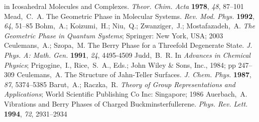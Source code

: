 \documentclass[superscriptaddress,showpacs,amsmath,amssymb,pra,twocolumn]{revtex4-1}
\begin{document}
\begin{thebibliography}{61}
  in Icosahedral Molecules and Complexes. \emph{Theor. Chim. Acta}
  \textbf{1978}, \emph{48}, 87--101\relax
\mciteBstWouldAddEndPuncttrue
\mciteSetBstMidEndSepPunct{\mcitedefaultmidpunct}
{\mcitedefaultendpunct}{\mcitedefaultseppunct}\relax
\EndOfBibitem
{}
Mead,~C.~A. The Geometric Phase in Molecular Systems. \emph{Rev. Mod.  Phys.} \textbf{1992}, \emph{64}, 51--85\relax
\mciteBstWouldAddEndPuncttrue
\mciteSetBstMidEndSepPunct{\mcitedefaultmidpunct}
{\mcitedefaultendpunct}{\mcitedefaultseppunct}\relax
\EndOfBibitem
{}
Bohm,~A.; Koizumi,~H.; Niu,~Q.; Zwanziger,~J.; Mostafazadeh,~A. \emph{The
  Geometric Phase in Quantum Systems}; {Springer: New York, USA}; 2003\relax
\mciteBstWouldAddEndPuncttrue
\mciteSetBstMidEndSepPunct{\mcitedefaultmidpunct}
{\mcitedefaultendpunct}{\mcitedefaultseppunct}\relax
\EndOfBibitem
{}
Ceulemans,~A.; Szopa,~M. The {{Berry}} Phase for a Threefold Degenerate State.
  \emph{J. Phys. A: Math. Gen.} \textbf{1991},
  \emph{24}, 4495-4509\relax
\mciteBstWouldAddEndPuncttrue
\mciteSetBstMidEndSepPunct{\mcitedefaultmidpunct}
{\mcitedefaultendpunct}{\mcitedefaultseppunct}\relax
\EndOfBibitem
{}
Judd,~B.~R. In \emph{Advances in {{Chemical Physics}}}; Prigogine,~I.,
  Rice,~S.~A., Eds.; {John Wiley \& Sons, Inc.}, 1984; pp 247--309\relax
\mciteBstWouldAddEndPuncttrue
\mciteSetBstMidEndSepPunct{\mcitedefaultmidpunct}
{\mcitedefaultendpunct}{\mcitedefaultseppunct}\relax
\EndOfBibitem
{}
Ceulemans,~A. The Structure of Jahn-Teller Surfaces. \emph{J. Chem. Phys.} \textbf{1987}, \emph{87}, 5374--5385\relax
\mciteBstWouldAddEndPuncttrue
\mciteSetBstMidEndSepPunct{\mcitedefaultmidpunct}
{\mcitedefaultendpunct}{\mcitedefaultseppunct}\relax
\EndOfBibitem
{}
Barut,~A.; Raczka,~R. \emph{Theory of Group Representations and Applications};
  {World Scientific Publishing Co Inc: Singapore}; 1986\relax
\mciteBstWouldAddEndPuncttrue
\mciteSetBstMidEndSepPunct{\mcitedefaultmidpunct}
{\mcitedefaultendpunct}{\mcitedefaultseppunct}\relax
\EndOfBibitem
{}
Auerbach,~A. Vibrations and {{Berry}} Phases of Charged Buckminsterfullerene.
  \emph{Phys. Rev. Lett.} \textbf{1994}, \emph{72}, 2931--2934\relax
\mciteBstWouldAddEndPuncttrue
\mciteSetBstMidEndSepPunct{\mcitedefaultmidpunct}

\end{thebibliography}
\end{document}
